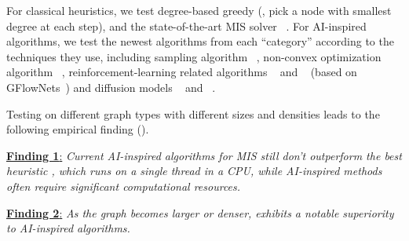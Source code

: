 
For classical heuristics, we test degree-based greedy (\deggreedy, pick a node with smallest degree at each step), and the state-of-the-art MIS solver \kamis~\citep{lamm2017finding, dahlum2016accelerating, hespe2019scalable}.
For AI-inspired algorithms, we test the newest algorithms from each ``category'' according to the techniques they use, including sampling algorithm \isco~\citep{sun2023revisiting}, non-convex optimization algorithm \pcqo~\citep{alkhouri2024dataless}, reinforcement-learning related algorithms \lwd~\citep{ahn2020learning} and  \gflownets~\citep{zhang2023let} (based on GFlowNets~\citep{bengio2021flow}) and diffusion models \difusco~\citep{sun2023difusco} and \diffuco~\citep{sanokowskidiffusion}.

Testing on different graph types with different sizes and densities leads to the following empirical finding ().


\underline{\textbf{Finding 1}:} \emph{Current AI-inspired algorithms for MIS still don't outperform the best heuristic \kamis, which runs on a single thread in a CPU, while AI-inspired methods often require significant computational resources.}

\underline{\textbf{Finding 2}:} \emph{As the graph becomes larger or denser, \kamis  exhibits a notable superiority to AI-inspired algorithms.}

